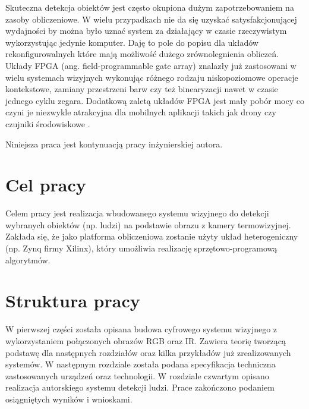 Skuteczna detekcja obiektów jest często okupiona dużym zapotrzebowaniem na zasoby obliczeniowe. W wielu przypadkach nie da się uzyskać satysfakcjonującej wydajności by można było uznać  system za działający w czasie rzeczywistym wykorzystując jedynie komputer. Daję to pole do popisu dla układów rekonfigurowalnych które mają możliwość dużego zrównolegnienia obliczeń. Układy FPGA (ang. field-programmable gate array) znalazły już zastosowani w wielu systemach wizyjnych wykonując różnego rodzaju niskopoziomowe operacje kontekstowe, zamiany przestrzeni barw czy też binearyzacji nawet w czasie jednego cyklu zegara. Dodatkową zaletą układów FPGA jest mały pobór mocy co czyni je niezwykle atrakcyjna dla mobilnych aplikacji takich jak drony czy czujniki środowiskowe \cite{garcia2014survey}. 

Niniejsza praca jest kontynuacją pracy inżynierskiej autora.

\section{Cel pracy}


Celem pracy jest realizacja wbudowanego systemu wizyjnego do detekcji wybranych obiektów (np. ludzi) na podstawie obrazu z kamery termowizyjnej. Zakłada się, że jako platforma obliczeniowa zostanie użyty układ heterogeniczny (np. Zynq firmy Xilinx), który umożliwia realizację sprzętowo-programową algorytmów.

\section{Struktura pracy}

W pierwszej części została opisana budowa cyfrowego systemu wizyjnego z wykorzystaniem połączonych obrazów RGB oraz IR. Zawiera teorię tworzącą podstawę dla następnych rozdziałów oraz kilka przykładów już zrealizowanych systemów. W następnym rozdziale została podana specyfikacja techniczna zastosowanych urządzeń oraz technologii. W rozdziale czwartym opisano realizacja autorskiego systemu detekcji ludzi. Prace zakończono podaniem osiągniętych wyników i wnioskami.